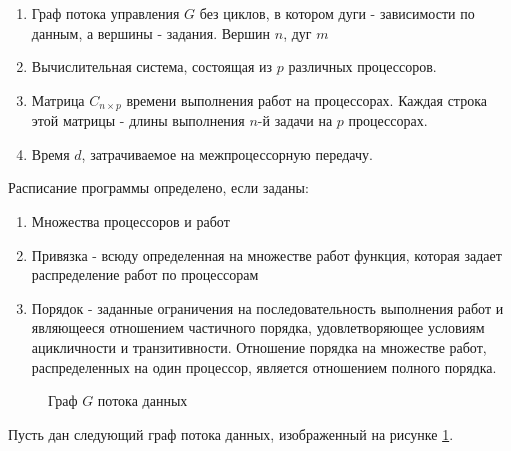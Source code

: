 \begin{enumerate}
    \item Граф потока управления $G$ без циклов, в котором дуги - зависимости по данным, а вершины - задания. Вершин $n$, дуг $m$
    \item Вычислительная система, состоящая из $p$ различных процессоров.
    \item Матрица $C_{n \times p}$ времени выполнения работ на процессорах. Каждая строка этой матрицы - длины выполнения $n$-й задачи на $p$ процессорах. 
    \item Время $d$, затрачиваемое на межпроцессорную передачу.
\end{enumerate}

Расписание программы определено, если заданы:
\begin{enumerate}
    \item Множества процессоров и работ
    \item Привязка - всюду определенная на множестве работ функция, которая задает распределение работ по процессорам
    \item Порядок - заданные ограничения на последовательность выполнения работ и являющееся отношением частичного порядка, удовлетворяющее условиям ацикличности и транзитивности. Отношение порядка на множестве работ, распределенных на один процессор, является отношением полного порядка.
\end{enumerate}

\begin{figure}[!htbp]
    \caption{Граф $G$ потока данных}
    \label{fig:DFG}
\end{figure}
Пусть дан следующий граф потока данных, изображенный на рисунке \ref{fig:DFG}.

